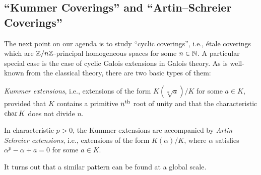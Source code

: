 \subsection{\enquote{Kummer Coverings} and \enquote{Artin--Schreier Coverings}}
The next point on our agenda is to study \enquote{cyclic coverings}, i.e., étale coverings which are $\mathbb{Z}/n\mathbb{Z}$-principal homogeneous spaces for some $n\in\mathbb{N}$. A particular special case is the case of cyclic Galois extensions in Galois theory. As is well-known from the classical theory, there are two basic types of them:
\begin{numerate}
	\item \emph{Kummer extensions}, i.e., extensions of the form $K\left(\sqrt[n]{a}\right)/K$ for some $a\in K$, provided that $K$ contains a primitive $n^{\text{th}}$ root of unity and that the characteristic $\operatorname{char} K$ does not divide $n$.
	\item In characteristic $p>0$, the Kummer extensions are accompanied by \emph{Artin--Schreier extensions}, i.e., extensions of the form $K(\alpha)/K$, where $\alpha$ satisfies $\alpha^p-\alpha+a=0$ for some $a\in K$.
\end{numerate}
It turns out that a similar pattern can be found at a global scale.

